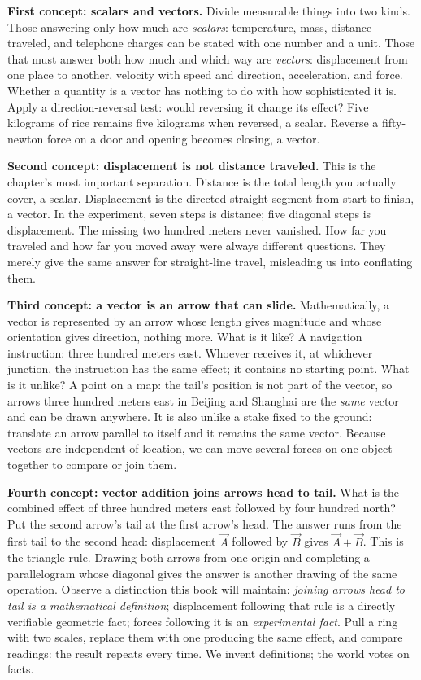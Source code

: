 \begin{mainline}
\textbf{First concept: scalars and vectors.} Divide measurable things into two kinds. Those answering only how much are \emph{scalars}: temperature, mass, distance traveled, and telephone charges can be stated with one number and a unit. Those that must answer both how much and which way are \emph{vectors}: displacement from one place to another, velocity with speed and direction, acceleration, and force. Whether a quantity is a vector has nothing to do with how sophisticated it is. Apply a direction-reversal test: would reversing it change its effect? Five kilograms of rice remains five kilograms when reversed, a scalar. Reverse a fifty-newton force on a door and opening becomes closing, a vector.

\textbf{Second concept: displacement is not distance traveled.} This is the chapter's most important separation. Distance is the total length you actually cover, a scalar. Displacement is the directed straight segment from start to finish, a vector. In the experiment, seven steps is distance; five diagonal steps is displacement. The missing two hundred meters never vanished. How far you traveled and how far you moved away were always different questions. They merely give the same answer for straight-line travel, misleading us into conflating them.

\textbf{Third concept: a vector is an arrow that can slide.} Mathematically, a vector is represented by an arrow whose length gives magnitude and whose orientation gives direction, nothing more. What is it like? A navigation instruction: three hundred meters east. Whoever receives it, at whichever junction, the instruction has the same effect; it contains no starting point. What is it unlike? A point on a map: the tail's position is not part of the vector, so arrows three hundred meters east in Beijing and Shanghai are the \emph{same} vector and can be drawn anywhere. It is also unlike a stake fixed to the ground: translate an arrow parallel to itself and it remains the same vector. Because vectors are independent of location, we can move several forces on one object together to compare or join them.

\textbf{Fourth concept: vector addition joins arrows head to tail.} What is the combined effect of three hundred meters east followed by four hundred north? Put the second arrow's tail at the first arrow's head. The answer runs from the first tail to the second head: displacement \(\vec{A}\) followed by \(\vec{B}\) gives \(\vec{A}+\vec{B}\). This is the triangle rule. Drawing both arrows from one origin and completing a parallelogram whose diagonal gives the answer is another drawing of the same operation. Observe a distinction this book will maintain: \emph{joining arrows head to tail is a mathematical definition}; displacement following that rule is a directly verifiable geometric fact; forces following it is an \emph{experimental fact}. Pull a ring with two scales, replace them with one producing the same effect, and compare readings: the result repeats every time. We invent definitions; the world votes on facts.
\end{mainline}

